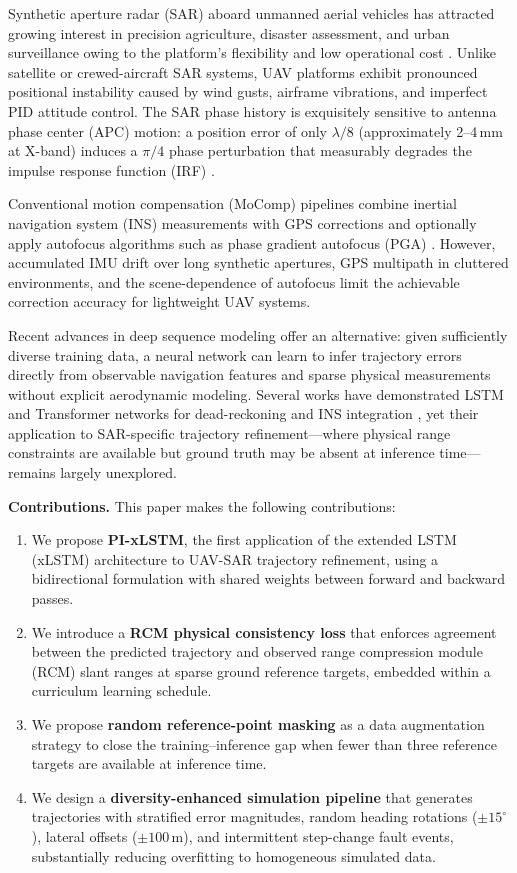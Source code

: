 \documentclass[conference]{IEEEtran}
\begin{document}
Synthetic aperture radar (SAR) aboard unmanned aerial vehicles
has attracted growing interest in precision agriculture, disaster assessment,
and urban surveillance owing to the platform's flexibility and low operational cost
\cite{cumming2005digital}.
Unlike satellite or crewed-aircraft SAR systems,
UAV platforms exhibit pronounced positional instability caused by wind gusts,
airframe vibrations, and imperfect PID attitude control.
The SAR phase history is exquisitely sensitive to antenna phase center (APC) motion:
a position error of only $\lambda/8$ (approximately 2–4\,mm at X-band)
induces a $\pi/4$ phase perturbation that measurably degrades the impulse response
function (IRF) \cite{moreira1994airborne}.

Conventional motion compensation (MoComp) pipelines combine
inertial navigation system (INS) measurements with GPS corrections and
optionally apply autofocus algorithms such as phase gradient autofocus (PGA)
\cite{wahl1994pga}.
However, accumulated IMU drift over long synthetic apertures,
GPS multipath in cluttered environments, and the scene-dependence of autofocus
limit the achievable correction accuracy for lightweight UAV systems.

Recent advances in deep sequence modeling offer an alternative:
given sufficiently diverse training data,
a neural network can learn to infer trajectory errors directly from
observable navigation features and sparse physical measurements
without explicit aerodynamic modeling.
Several works have demonstrated LSTM and Transformer networks for
dead-reckoning and INS integration
\cite{yan2018ridi,liu2022aionet},
yet their application to SAR-specific trajectory refinement—where
physical range constraints are available but ground truth may be absent at inference
time—remains largely unexplored.

\textbf{Contributions.}
This paper makes the following contributions:
\begin{enumerate}
  \item We propose \textbf{PI-xLSTM}, the first application of the extended
        LSTM (xLSTM) architecture \cite{beck2024xlstm}
        to UAV-SAR trajectory refinement,
        using a bidirectional formulation with shared weights between
        forward and backward passes.
  \item We introduce a \textbf{RCM physical consistency loss} that enforces
        agreement between the predicted trajectory and observed
        range compression module (RCM) slant ranges at sparse ground reference
        targets, embedded within a curriculum learning schedule.
  \item We propose \textbf{random reference-point masking} as a data
        augmentation strategy to close the training–inference gap when
        fewer than three reference targets are available at inference time.
  \item We design a \textbf{diversity-enhanced simulation pipeline} that generates
        trajectories with stratified error magnitudes,
        random heading rotations ($\pm15^\circ$),
        lateral offsets ($\pm100$\,m),
        and intermittent step-change fault events,
        substantially reducing overfitting to homogeneous simulated data.
\end{enumerate}
\end{document}

